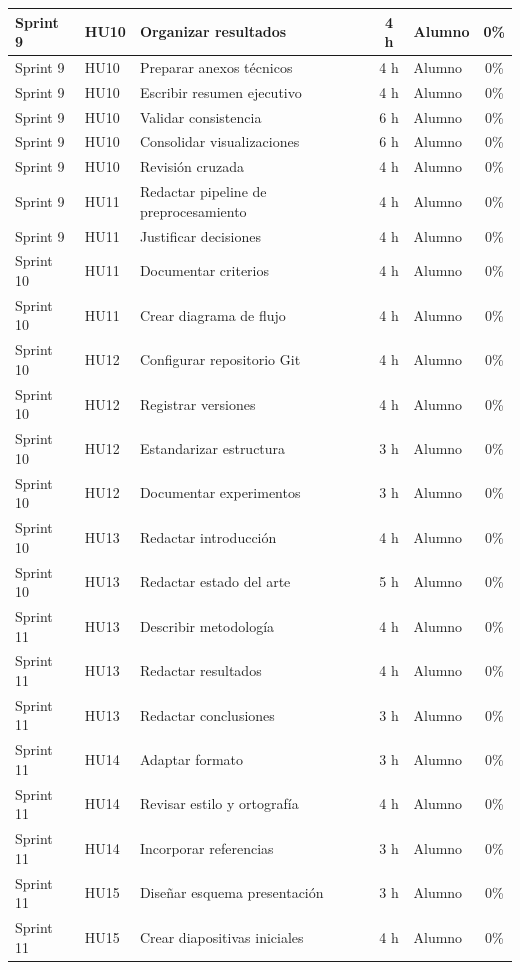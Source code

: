 \documentclass[
11pt, %
]{charter}
\begin{document}
\begin{table}[htpb]
\begin{tabularx}{\linewidth}{@{}|l|l|X|c|l|c|@{}}
Sprint 9 & HU10 & Organizar resultados & 4 h & Alumno & 0\% \\ \hline
Sprint 9 & HU10 & Preparar anexos técnicos & 4 h & Alumno & 0\% \\ \hline
Sprint 9 & HU10 & Escribir resumen ejecutivo & 4 h & Alumno & 0\% \\ \hline
Sprint 9 & HU10 & Validar consistencia & 6 h & Alumno & 0\% \\ \hline
Sprint 9 & HU10 & Consolidar visualizaciones & 6 h & Alumno & 0\% \\ \hline
Sprint 9 & HU10 & Revisión cruzada & 4 h & Alumno & 0\% \\ \hline
Sprint 9 & HU11 & Redactar pipeline de preprocesamiento & 4 h & Alumno & 0\% \\ \hline
Sprint 9 & HU11 & Justificar decisiones & 4 h & Alumno & 0\% \\ \hline

Sprint 10 & HU11 & Documentar criterios & 4 h & Alumno & 0\% \\ \hline
Sprint 10 & HU11 & Crear diagrama de flujo & 4 h & Alumno & 0\% \\ \hline
Sprint 10 & HU12 & Configurar repositorio Git & 4 h & Alumno & 0\% \\ \hline
Sprint 10 & HU12 & Registrar versiones & 4 h & Alumno & 0\% \\ \hline
Sprint 10 & HU12 & Estandarizar estructura & 3 h & Alumno & 0\% \\ \hline
Sprint 10 & HU12 & Documentar experimentos & 3 h & Alumno & 0\% \\ \hline
Sprint 10 & HU13 & Redactar introducción & 4 h & Alumno & 0\% \\ \hline
Sprint 10 & HU13 & Redactar estado del arte & 5 h & Alumno & 0\% \\ \hline

Sprint 11 & HU13 & Describir metodología & 4 h & Alumno & 0\% \\ \hline
Sprint 11 & HU13 & Redactar resultados & 4 h & Alumno & 0\% \\ \hline
Sprint 11 & HU13 & Redactar conclusiones & 3 h & Alumno & 0\% \\ \hline
Sprint 11 & HU14 & Adaptar formato & 3 h & Alumno & 0\% \\ \hline
Sprint 11 & HU14 & Revisar estilo y ortografía & 4 h & Alumno & 0\% \\ \hline
Sprint 11 & HU14 & Incorporar referencias & 3 h & Alumno & 0\% \\ \hline
Sprint 11 & HU15 & Diseñar esquema presentación & 3 h & Alumno & 0\% \\ \hline
Sprint 11 & HU15 & Crear diapositivas iniciales & 4 h & Alumno & 0\% \\ \hline


\end{tabularx}
\end{table}
\end{document}
